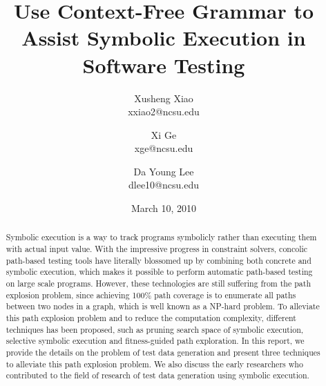 \documentclass[times, 10pt,onecolumn]{article}
\title{Use Context-Free Grammar to Assist Symbolic Execution in Software Testing}
\author{
Xusheng Xiao\\
\small{xxiao2@ncsu.edu}\\
\and
Xi Ge\\
\small{xge@ncsu.edu}\\
\and
Da Young Lee\\
\small{dlee10@ncsu.edu}
}
\date{March 10, 2010}
\begin{document}
\maketitle


\begin{abstract}
Symbolic execution is a way to track programs symbolicly rather than executing them with actual input value. With the impressive progress in constraint solvers, concolic path-based testing tools have literally blossomed up by combining both concrete and symbolic execution, which makes it possible to perform automatic path-based testing on large scale programs. However, these technologies are still suffering from the path explosion problem, since achieving 100\% path coverage is to enumerate all paths between two nodes in a graph, which is well known as a NP-hard problem. To alleviate this path explosion problem and to reduce the computation complexity, different techniques has been proposed, such as pruning search space of symbolic execution, selective symbolic execution and fitness-guided path exploration. In this report, we provide the details on the problem of test data generation and present three techniques to alleviate this path explosion problem. We also discuss the early researchers who contributed to the field of research of test data generation using symbolic execution. \end{abstract}













\end{document}
